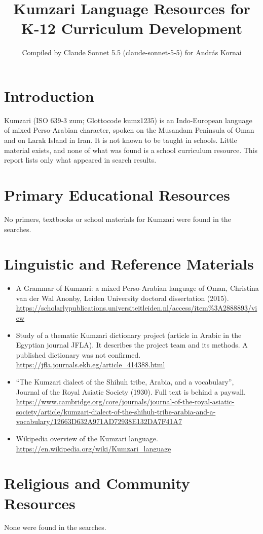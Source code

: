 \documentclass[12pt]{article}
\title{Kumzari Language Resources for K-12 Curriculum Development}
\author{Compiled by Claude Sonnet 5.5 (claude-sonnet-5-5) for Andr\'as Kornai}
\date{}
\begin{document}
\maketitle

\section{Introduction}
Kumzari (ISO 639-3 zum; Glottocode kumz1235) is an Indo-European language of mixed Perso-Arabian character, spoken on the Musandam Peninsula of Oman and on Larak Island in Iran. It is not known to be taught in schools. Little material exists, and none of what was found is a school curriculum resource. This report lists only what appeared in search results.

\section{Primary Educational Resources}
No primers, textbooks or school materials for Kumzari were found in the searches.

\section{Linguistic and Reference Materials}
\begin{itemize}
\item A Grammar of Kumzari: a mixed Perso-Arabian language of Oman, Christina van der Wal Anonby, Leiden University doctoral dissertation (2015). \url{https://scholarlypublications.universiteitleiden.nl/access/item%3A2888893/view}
\item Study of a thematic Kumzari dictionary project (article in Arabic in the Egyptian journal JFLA). It describes the project team and its methods. A published dictionary was not confirmed. \url{https://jfla.journals.ekb.eg/article_414388.html}
\item ``The Kumzari dialect of the Shihuh tribe, Arabia, and a vocabulary'', Journal of the Royal Asiatic Society (1930). Full text is behind a paywall. \url{https://www.cambridge.org/core/journals/journal-of-the-royal-asiatic-society/article/kumzari-dialect-of-the-shihuh-tribe-arabia-and-a-vocabulary/12663D632A971AD72938E132DA7F41A7}
\item Wikipedia overview of the Kumzari language. \url{https://en.wikipedia.org/wiki/Kumzari_language}
\end{itemize}

\section{Religious and Community Resources}
None were found in the searches.
\end{document}

